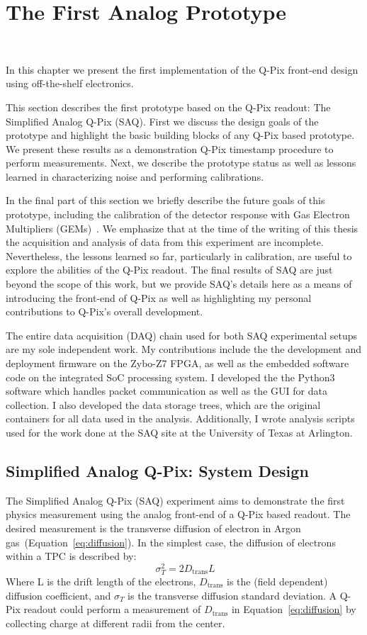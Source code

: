 \chapter{The First Analog Prototype}~\label{chap:saq}

In this chapter we present the first implementation of the Q-Pix front-end design using off-the-shelf electronics.

This section describes the first prototype based on the Q-Pix readout: The Simplified Analog Q-Pix (SAQ).
First we discuss the design goals of the prototype and highlight the basic building blocks of any Q-Pix based prototype.
We present these results as a demonstration Q-Pix timestamp procedure to perform measurements.
Next, we describe the prototype status as well as lessons learned in characterizing noise and performing calibrations.

In the final part of this section we briefly describe the future goals of this prototype, including the calibration of the detector response with Gas Electron Multipliers (GEMs)~\citep{SAULI20162}.
We emphasize that at the time of the writing of this thesis the acquisition and analysis of data from this experiment are incomplete.
Nevertheless, the lessons learned so far, particularly in calibration, are useful to explore the abilities of the Q-Pix readout.
The final results of SAQ are just beyond the scope of this work, but we provide SAQ's details here as a means of introducing the front-end of Q-Pix as well as highlighting my personal contributions to Q-Pix's overall development.

The entire data acquisition (DAQ) chain used for both SAQ experimental setups are my sole independent work.
My contributions include the the development and deployment firmware on the Zybo-Z7 FPGA, as well as the embedded software code on the integrated SoC processing system.
I developed the the Python3 software which handles packet communication as well as the GUI for data collection.
I also developed the data storage trees, which are the original containers for all data used in the analysis. 
Additionally, I wrote analysis scripts used for the work done at the SAQ site at the University of Texas at Arlington.

\section{Simplified Analog Q-Pix: System Design}
The Simplified Analog Q-Pix (SAQ) experiment aims to demonstrate the first physics measurement using the analog front-end of a Q-Pix based readout.
The desired measurement is the transverse diffusion of electron in Argon gas~(Equation~\ref{eq:diffusion}).
In the simplest case, the diffusion of electrons within a TPC is described by:
\begin{equation}~\label{eq:diffusion}
 \sigma^{2}_{T} = 2D_{\mathrm{trans}}L
\end{equation}
Where L is the drift length of the electrons, $D_{\mathrm{trans}}$ is the (field dependent) diffusion coefficient, and $\sigma_{T}$ is the transverse diffusion standard deviation.
A Q-Pix readout could perform a measurement of $D_{\mathrm{trans}}$ in Equation~\ref{eq:diffusion} by collecting charge at different radii from the center.

